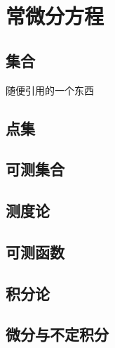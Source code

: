 \documentclass[12pt, a4paper, oneside, UTF8]{ctexbook}
\begin{document}
	\else
	\fi
	\chapter{常微分方程}
	\section{集合}
	随便引用的一个东西\cite{choy20194d}
	
	\section{点集}
	
	\section{可测集合}
	
	\section{测度论}
	
	\section{可测函数}
	
	\section{积分论}
	
	\section{微分与不定积分}
	
	\ifx\allfiles\undefined
\end{document}
